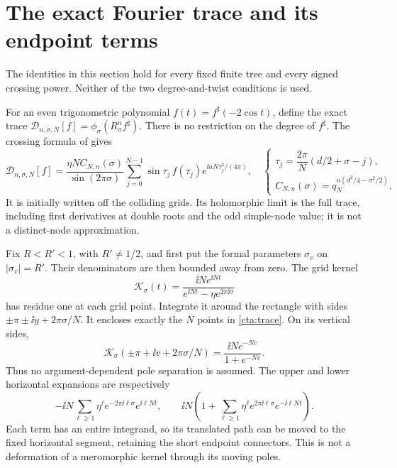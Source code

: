 \section{The exact Fourier trace and its endpoint terms}\label{ct:trace-section}
The identities in this section hold for every fixed finite tree and every signed crossing power. Neither of the two degree-and-twist conditions is used.

For an even trigonometric polynomial
\(f(t)=f^\sharp(-2\cos t)\), define the exact trace
\(\mathcal D_{n,\sigma,N}[f]=\phi_\sigma(R_\sigma^n f^\sharp)\).
There is no restriction on the degree of \(f^\sharp\).
The crossing formula of
\cite[Proposition~6.1 and equation~(6.4)]{Meridian} gives
\begin{equation}\label{cta:trace}
 \mathcal D_{n,\sigma,N}[f]
 =\frac{\eta N C_{N,n}(\sigma)}{\sin(2\pi\sigma)}
   \sum_{j=0}^{N-1}
     \sin\tau_j\, f(\tau_j)e^{\ii nN\tau_j^2/(4\pi)},
 \quad
 \begin{cases}
 \tau_j=\dfrac{2\pi}{N}(d/2+\sigma-j),\\
 C_{N,n}(\sigma)=q_N^{n(d^2/4-\sigma^2/2)} .
 \end{cases}
\end{equation}
It is initially written off the colliding grids. Its holomorphic
limit is the full trace, including first derivatives at double roots and the odd
simple-node value; it is not a distinct-node approximation.

Fix \(R<R'<1\), with \(R'\ne1/2\), and first put the formal
parameters \(\sigma_v\) on \(|\sigma_v|=R'\).
Their denominators are then bounded away from zero.
The grid kernel
\[
 \mathcal K_\sigma(t)=
 \frac{\ii N e^{\ii Nt}}{e^{\ii Nt}-\eta e^{2\pi\ii\sigma}}
\]
has residue one at each grid point. Integrate it around the
rectangle with sides \(\pm\pi\pm\ii y+2\pi\sigma/N\).
It encloses exactly the \(N\) points in \eqref{cta:trace}.
On its vertical sides,
\[
 \mathcal K_\sigma(\pm\pi+\ii v+2\pi\sigma/N)
           =\frac{\ii N e^{-Nv}}{1+e^{-Nv}}.
\]
Thus no argument-dependent pole separation is assumed.
The upper and lower horizontal expansions are respectively
\[
 -\ii N\sum_{\ell\ge1}
     \eta^\ell e^{-2\pi\ii\ell\sigma}e^{\ii\ell Nt},
 \qquad
 \ii N\left(1+\sum_{\ell\ge1}
     \eta^\ell e^{2\pi\ii\ell\sigma}e^{-\ii\ell Nt}\right).
\]
Each term has an entire integrand, so its translated path can
be moved to the fixed horizontal segment, retaining the short
endpoint connectors. This is not a deformation of a meromorphic
kernel through its moving poles.

